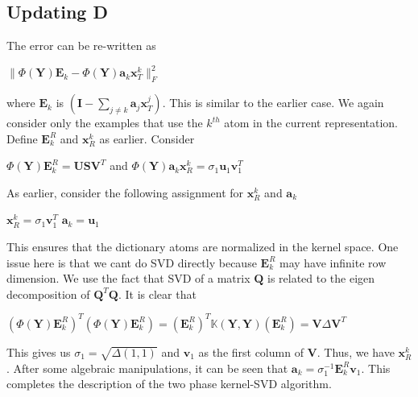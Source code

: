 \documentclass[10pt,a4paper,final]{article}
\begin{document}
\subsection{Updating D}
The error can be re-written as 
\begin{center}
$\|\Phi\left(\mathbf{Y}\right)\mathbf{E}_k-\Phi\left(\mathbf{Y}\right)\mathbf{a}_k\mathbf{x}_T^k\|_F^2$
\end{center}
where $\mathbf{E}_k$ is $\left(\mathbf{I}-\sum_{j\neq k}\mathbf{a}_j\mathbf{x}_T^j\right)$.
This is similar to the earlier case. We again consider only the examples that use the $k^{th}$ atom in the current representation. Define $\mathbf{E}_k^R$ and $\mathbf{x}_R^k$ as earlier.  Consider
\begin{center}
$\Phi\left(\mathbf{Y}\right)\mathbf{E}_k^R = \mathbf{USV}^T$ and $\Phi\left(\mathbf{Y}\right)\mathbf{a}_k\mathbf{x}_R^k=\sigma_1\mathbf{u}_1\mathbf{v}_1^T$
\end{center}
As earlier, consider the following assignment for $\mathbf{x}_R^k$ and $\mathbf{a}_k$
\begin{center}
$\mathbf{x}_R^k = \sigma_1\mathbf{v}_1^T$
$\mathbf{a}_k = \mathbf{u}_1$ 
\end{center}
This ensures that the dictionary atoms are normalized in the kernel space. 
One issue here is that we cant do SVD directly because $\mathbf{E}_k^R$ may have infinite row dimension. We use the fact that SVD of a matrix $\mathbf{Q}$ is related to the eigen decomposition of $\mathbf{Q}^T\mathbf{Q}$. It is clear that
\begin{center}
$\left(\Phi\left(\mathbf{Y}\right)\mathbf{E}_k^R\right)^T\left(\Phi\left(\mathbf{Y}\right)\mathbf{E}_k^R\right)=\left(\mathbf{E}_k^R\right)^T\mathbb{K}\left(\mathbf{Y},\mathbf{Y}\right)\left(\mathbf{E}_k^R\right)=\mathbf{V}\Delta\mathbf{V}^T$
\end{center}
This gives us $\sigma_1=\sqrt{\Delta\left(1,1\right)}$ and $\mathbf{v}_1$ as the first column of $\mathbf{V}$. Thus, we have $\mathbf{x}_R^k$. After some algebraic manipulations, it can be seen that $\mathbf{a}_k=\sigma_1^{-1}\mathbf{E}_k^R\mathbf{v}_1$. This completes the description of the two phase kernel-SVD algorithm.
\end{document}
